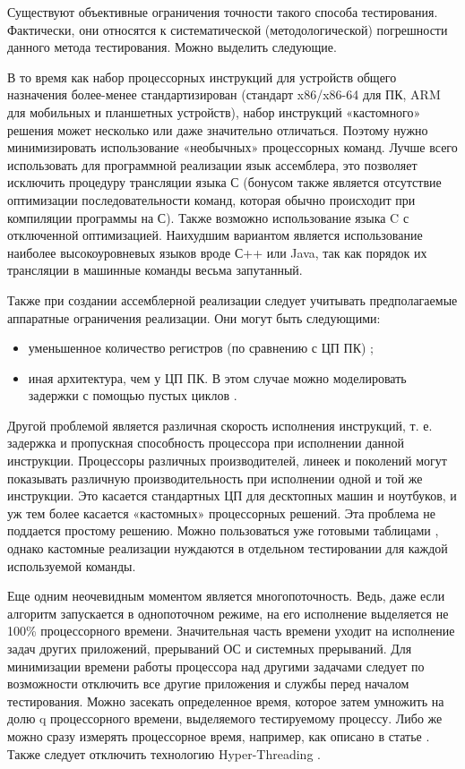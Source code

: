 Существуют объективные ограничения точности такого способа тестирования. Фактически, они относятся к систематической (методологической) погрешности данного метода тестирования. Можно выделить следующие.

В то время как набор процессорных инструкций для устройств общего назначения более-менее стандартизирован (стандарт x86/x86-64 для ПК, ARM для мобильных и планшетных устройств), набор инструкций «кастомного» решения может несколько или даже значительно отличаться. Поэтому нужно минимизировать использование «необычных» процессорных команд. Лучше всего использовать для программной реализации язык ассемблера, это позволяет исключить процедуру трансляции языка С (бонусом также является отсутствие оптимизации последовательности команд, которая обычно происходит при компиляции программы на С). Также возможно использование языка C с отключенной оптимизацией. Наихудшим вариантом является использование наиболее высокоуровневых языков вроде С++ или Java, так как порядок их трансляции в машинные команды весьма запутанный.

Также при создании ассемблерной реализации следует учитывать предполагаемые аппаратные ограничения реализации. Они могут быть следующими:
\begin{itemize}
	\item уменьшенное количество регистров (по сравнению с ЦП ПК) \cite{src58};
	\item иная архитектура, чем у ЦП ПК. В этом случае можно моделировать задержки с помощью пустых циклов \cite{src59}.
\end{itemize}

Другой проблемой является различная скорость исполнения инструкций, т. е. задержка и пропускная способность процессора при исполнении данной инструкции. Процессоры различных производителей, линеек и поколений могут показывать различную производительность при исполнении одной и той же инструкции. Это касается стандартных ЦП для десктопных машин и ноутбуков, и уж тем более касается «кастомных» процессорных решений. Эта проблема не поддается простому решению. Можно пользоваться уже готовыми таблицами \cite{src60}, однако кастомные реализации нуждаются в отдельном тестировании для каждой используемой команды.

Еще одним неочевидным моментом является многопоточность. Ведь, даже если алгоритм запускается в однопоточном режиме, на его исполнение выделяется не 100\% процессорного времени. Значительная часть времени уходит на исполнение задач других приложений, прерываний ОС и системных прерываний. Для минимизации времени работы процессора над другими задачами следует по возможности отключить все другие приложения и службы перед началом тестирования. Можно засекать определенное время, которое затем умножить на долю q процессорного времени, выделяемого тестируемому процессу. Либо же можно сразу измерять процессорное время, например, как описано в статье \cite{src61}. Также следует отключить технологию Hyper-Threading \cite{src62}.

